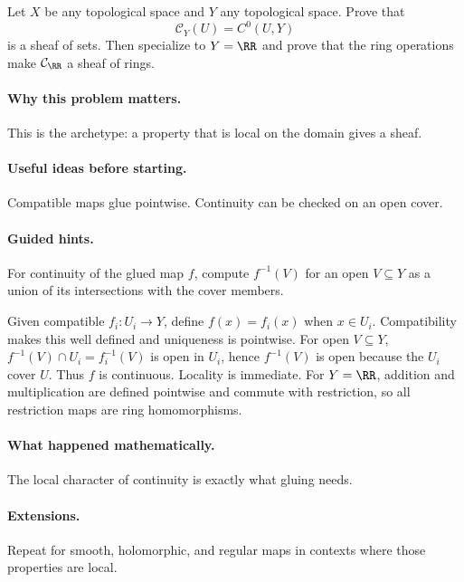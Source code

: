 \begin{problem}
Let $X$ be any topological space and $Y$ any topological space. Prove that
\[
\mathcal C_Y(U)=C^0(U,Y)
\]
is a sheaf of sets. Then specialize to $Y=\RR$ and prove that the ring operations make $\mathcal C_\RR$ a sheaf of rings.
\end{problem}

\paragraph{Why this problem matters.}
This is the archetype: a property that is local on the domain gives a sheaf.

\paragraph{Useful ideas before starting.}
Compatible maps glue pointwise. Continuity can be checked on an open cover.

\paragraph{Guided hints.}
For continuity of the glued map $f$, compute $f^{-1}(V)$ for an open $V\subseteq Y$ as a union of its intersections with the cover members.

\ifdefined\FullProblemDossiers
\begin{solution}
Given compatible $f_i:U_i\to Y$, define $f(x)=f_i(x)$ when $x\in U_i$. Compatibility makes this well defined and uniqueness is pointwise. For open $V\subseteq Y$, $f^{-1}(V)\cap U_i=f_i^{-1}(V)$ is open in $U_i$, hence $f^{-1}(V)$ is open because the $U_i$ cover $U$. Thus $f$ is continuous. Locality is immediate. For $Y=\RR$, addition and multiplication are defined pointwise and commute with restriction, so all restriction maps are ring homomorphisms.
\end{solution}

\paragraph{What happened mathematically.}
The local character of continuity is exactly what gluing needs.

\paragraph{Extensions.}
Repeat for smooth, holomorphic, and regular maps in contexts where those properties are local.
\fi
